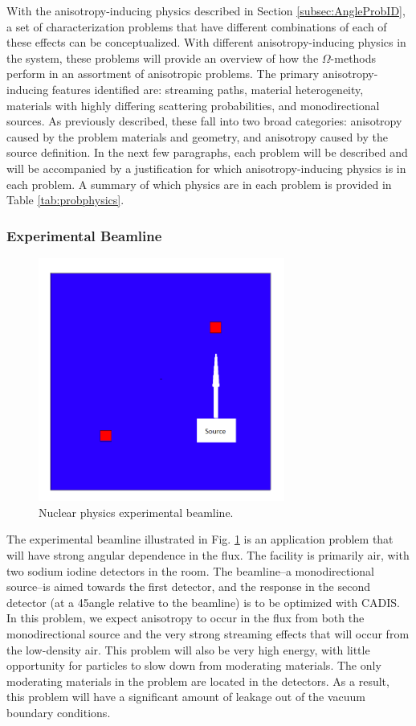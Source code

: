 With the anisotropy-inducing physics described in Section
\ref{subsec:AngleProbID}, a set of characterization problems that have
different combinations of each of these effects can be conceptualized. With
different anisotropy-inducing physics in the system, these problems will provide
an overview of how the $\Omega$-methods perform in an assortment of anisotropic
problems. The primary anisotropy-inducing features identified are: streaming
paths, material heterogeneity, materials with highly differing scattering
probabilities, and monodirectional sources. As previously described, these fall
into two broad categories: anisotropy caused by the problem materials and
geometry, and anisotropy caused by the source definition. In the next few
paragraphs, each problem will be described and will be accompanied by
a justification for which
anisotropy-inducing physics is in each problem. A summary of which physics are
in each problem is provided in Table \ref{tab:probphysics}.

\subsubsection*{Experimental Beamline}

\begin{figure}[h!]
  \centering
  \includegraphics[height=8cm]{./chapters/characterization_probs/figures/geometries/beam.png}
  \caption[Nuclear physics experimental beamline.]{Nuclear physics experimental beamline.}
  \label{fig:beamgeom}
\end{figure}

The experimental beamline illustrated in Fig. \ref{fig:beamgeom} is an
application problem that will have strong angular dependence in the flux. The
facility is primarily air, with two sodium iodine detectors in the room. The
beamline--a monodirectional source--is aimed towards the first detector, and
the response in the second detector (at a 45\degree angle
relative to the beamline) is to be optimized with CADIS. In this problem, we
expect anisotropy to occur in the flux from both the monodirectional source and
the very strong streaming effects that will occur from the low-density air. This
problem will also be very high energy, with little opportunity for particles to
slow down from moderating materials. The only moderating materials in the
problem are located in the detectors. As a result, this problem will have a
significant amount of leakage out of the vacuum boundary conditions.

